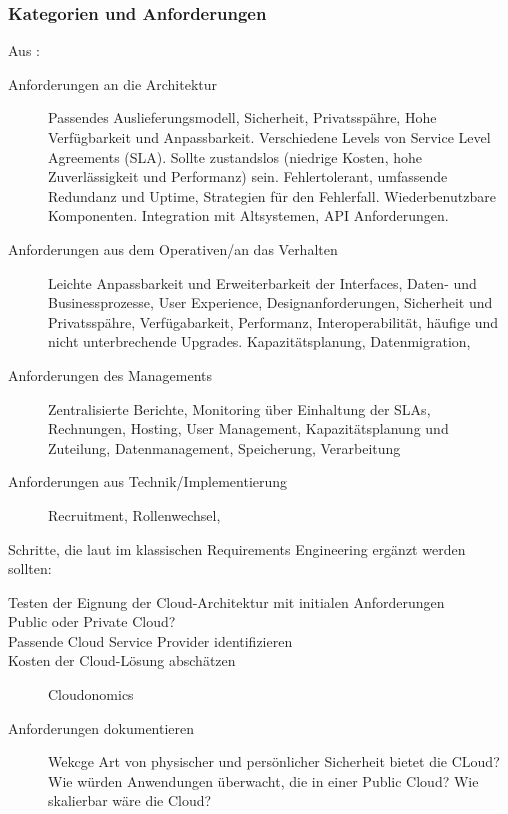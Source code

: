 \subsubsection{Kategorien und Anforderungen}
Aus :
\begin{description}
	\item[Anforderungen an die Architektur] Passendes Auslieferungsmodell, 
Sicherheit, Privatsspähre, Hohe Verfügbarkeit und Anpassbarkeit. Verschiedene 
Levels von Service Level Agreements (SLA). Sollte zustandslos (niedrige Kosten, 
hohe Zuverlässigkeit und Performanz) sein. Fehlertolerant, umfassende 
Redundanz und Uptime, Strategien für den Fehlerfall. Wiederbenutzbare 
Komponenten. Integration mit Altsystemen, API Anforderungen. 
	\item[Anforderungen aus dem Operativen/an das Verhalten] Leichte 
Anpassbarkeit und Erweiterbarkeit der Interfaces, Daten- und Businessprozesse, 
User Experience, Designanforderungen, Sicherheit und Privatsspähre, 
Verfügabarkeit, Performanz, Interoperabilität, häufige und nicht unterbrechende 
Upgrades. Kapazitätsplanung, Datenmigration, 
	\item[Anforderungen des Managements] Zentralisierte Berichte, 
Monitoring über Einhaltung der SLAs, Rechnungen, Hosting, User Management, 
Kapazitätsplanung und Zuteilung, Datenmanagement, Speicherung, Verarbeitung
	\item[Anforderungen aus Technik/Implementierung] Recruitment, 
Rollenwechsel, 
\end{description}

Schritte, die laut 
 im klassischen 
Requirements Engineering ergänzt werden sollten:
\begin{description}
	\item[Testen der Eignung der Cloud-Architektur mit initialen 
Anforderungen]
	\item[Public oder Private Cloud?]
	\item[Passende Cloud Service Provider identifizieren]
	\item[Kosten der Cloud-Lösung abschätzen] Cloudonomics
	\item[Anforderungen dokumentieren] Wekcge Art von physischer und 
persönlicher Sicherheit bietet die CLoud? Wie würden Anwendungen überwacht, die 
in einer Public Cloud? Wie skalierbar wäre die Cloud?
\end{description}

